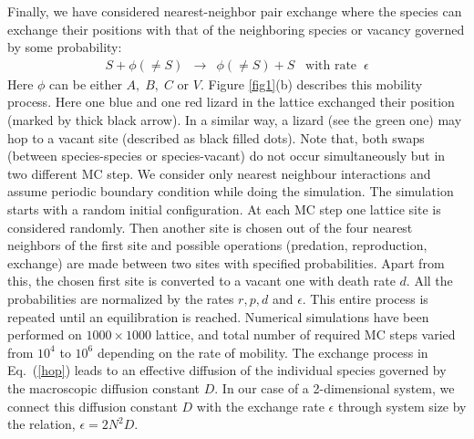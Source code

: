 \documentclass[aps, pre, twocolumn, amsmath, superscriptaddress,showkeys,showpacs]{revtex4-1}
\def\bea{\begin{eqnarray}}
\def\eea{\end{eqnarray}}
\begin{document}
  
Finally, we have considered { nearest-neighbor pair exchange where}  the species can exchange their positions with that of the neighboring species or vacancy governed by some probability:	
	\bea
	S + \phi(\neq S) & \longrightarrow & \phi(\neq S) + S \;\;\; \mbox{with rate}\;\; \epsilon
	\label{hop}
	\eea
Here $\phi$ can be either $A,\;B,\;C$ or $V$. Figure \ref{fig1}(b) describes this mobility process. {Here one blue and one red lizard in the  lattice   exchanged their position (marked by thick black arrow). In a similar way,  a lizard (see the green one) may hop to a vacant site (described as black filled dots). Note that, both swaps (between species-species or species-vacant) do not occur simultaneously but in two different MC step}. We consider only nearest neighbour interactions and assume periodic boundary condition while doing the simulation. 
The simulation starts with a random initial configuration. At each MC step one lattice site is considered randomly. {Then another site is chosen out of the four nearest neighbors of the first site and possible operations (predation, reproduction, exchange) are made between two sites with specified probabilities. Apart from this, the chosen first site is converted to a vacant one %
	 { with death rate $d$}. All the probabilities are normalized by the rates $r,p,d$ and $ \epsilon$. This entire process is repeated until an equilibration is reached.} {Numerical simulations have been performed on  $1000 \times 1000$ lattice,
and total number of required MC steps  varied from $10^4$ to $10^6$ depending on the  rate of mobility.} 		
The exchange process in Eq.~(\ref{hop}) leads to an effective diffusion of the individual species governed by the macroscopic diffusion constant $D$. {In our case of a 2-dimensional system, we connect this diffusion constant $D$ with the exchange rate $\epsilon$ through system size by the relation, $\epsilon=2 N^2 D $. \cite{reichenbach2007noise} }
	
\end{document}
